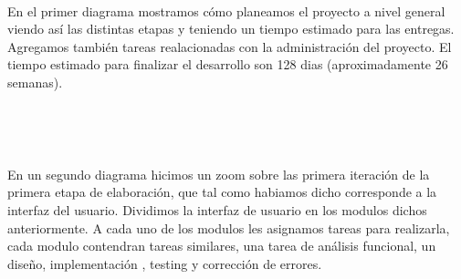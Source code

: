 \\ \par

En el primer diagrama mostramos cómo planeamos el proyecto a nivel general viendo así las distintas etapas y teniendo un tiempo estimado para las entregas. Agregamos tambi\'en tareas realacionadas con la administración del proyecto. El tiempo estimado para
finalizar el desarrollo son 128 dias (aproximadamente 26 semanas).	

\\ \par
\begin{figure}[H]
\end{figure}

\\ \par
En un segundo diagrama hicimos un zoom sobre las primera iteración de la primera etapa de elaboración, que tal como habiamos dicho corresponde a la interfaz del usuario. Dividimos la interfaz de usuario en los modulos dichos anteriormente. A cada uno de los modulos les asignamos tareas para realizarla, cada modulo contendran tareas similares, una tarea de an\'alisis funcional, un diseño, implementaci\'on , testing y correcci\'on de errores.

\\ \par
\begin{figure}[H]
\begin{center}
\end{center}
\end{figure}

\renewcommand{\labelitemi}{$\tiny \blacksquare$}

